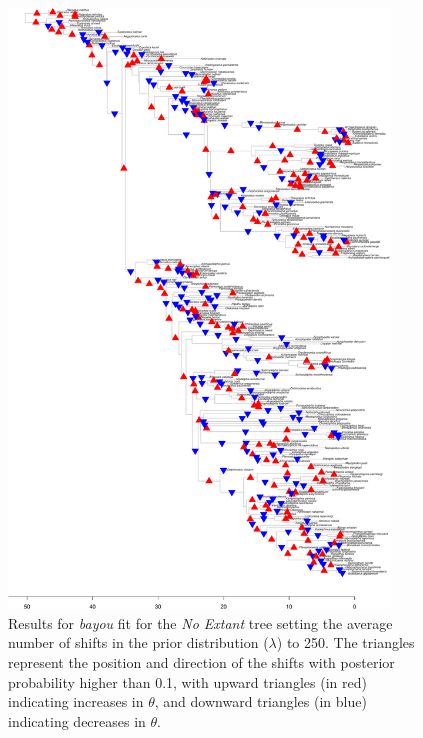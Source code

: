 \begin{figure}[H]
\includegraphics[width=0.9\textwidth]{img/plots-noextant-wZBL-k250-1.pdf}
\caption{Results for \textit{bayou} fit for the \textit{No Extant} tree setting the average number of shifts in the prior distribution ($\lambda$) to 250. The triangles represent the position and direction of the shifts with posterior probability higher than 0.1, with upward triangles (in red) indicating increases in $\theta$, and downward triangles (in blue) indicating decreases in $\theta$.}
\label{fig:noextant-k250}
\end{figure}

\newpage

